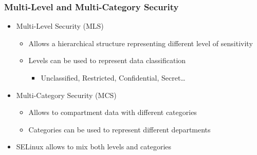 \begin{frame}
	\frametitle{Multi-Level and Multi-Category Security}
	\begin{itemize}
		\item Multi-Level Security (MLS)
			\begin{itemize}
				\item Allows a hierarchical structure representing different level of
					sensitivity
				\item Levels can be used to represent data classification
					\begin{itemize}
						\item Unclassified, Restricted, Confidential, Secret\ldots
					\end{itemize}
			\end{itemize}
		\item Multi-Category Security (MCS)
			\begin{itemize}
				\item Allows to compartment data with different categories
				\item Categories can be used to represent different departments
			\end{itemize}
		\item SELinux allows to mix both levels and categories
	\end{itemize}
\end{frame}

